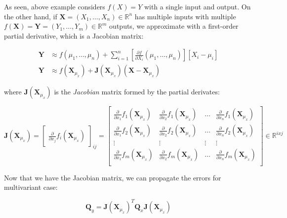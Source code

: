 \documentclass[a4paper]{report}
\numberwithin{figure}{section}
\newcommand{\R}{\mathbb{R}}
\begin{document}
As seen, above example considers $f(X)=Y$ with a single input and output. 
On the other hand, if $\mathbf{X}=(X_1,\dots,X_n) \in \R^n$ has multiple inputs with 
multiple $f(\mathbf{X})=\mathbf{Y}=(Y_1,\dots,Y_m) \in \R^m$ outputs,
we approximate with a first-order partial derivative, which is a Jacobian 
matrix:

\begin{equation}
  \begin{aligned}
    \mathbf{Y} & \approx f(\mu_1,\dots,\mu_n) + 
    \sum_{i=1}^{n} [\frac{\partial f}{\partial X_i}(\mu_1,\dots,\mu_n)][X_i-\mu_i] \\
    \mathbf{Y} & \approx f(\mathbf{X}_{\mu_x}) + \mathbf{J}(\mathbf{X}_{\mu_x}) (\mathbf{X} - \mathbf{X}_{\mu_x})
  \end{aligned}
\end{equation}

where $\mathbf{J}(\mathbf{X}_{\mu_x})$ is the \textit{Jacobian} matrix formed by 
the partial derivates:

\begin{equation}
  \mathbf{J}(\mathbf{X}_{\mu_x}) = \begin{bmatrix} \frac{\partial}{\partial x_j }f_i(\mathbf{X}_{\mu_x}) \end{bmatrix}_{ij} 
  = 
  \begin{bmatrix} 
    \frac{\partial}{\partial x_1}f_1(\mathbf{X}_{\mu_x}) & \frac{\partial}{\partial x_2}f_1(\mathbf{X}_{\mu_x}) & \dots & \frac{\partial}{\partial x_n}f_1(\mathbf{X}_{\mu_x}) \\
    \frac{\partial}{\partial x_1}f_2(\mathbf{X}_{\mu_x}) & \frac{\partial}{\partial x_2}f_2(\mathbf{X}_{\mu_x}) & \dots & \frac{\partial}{\partial x_n}f_2(\mathbf{X}_{\mu_x}) \\
\vdots & \vdots & \vdots & \vdots \\
    \frac{\partial}{\partial x_1}f_m(\mathbf{X}_{\mu_x}) & \frac{\partial}{\partial x_2}f_m(\mathbf{X}_{\mu_x}) & \dots & \frac{\partial}{\partial x_n}f_m(\mathbf{X}_{\mu_x}) \\
  \end{bmatrix}
  \in \R^{ixj}
\end{equation}

Now that we have the Jacobian matrix, we can propagate the errors for multivariant case:

\begin{equation}
  \mathbf{Q}_y = \mathbf{J}(\mathbf{X}_{\mu_x})^T \mathbf{Q}_x \mathbf{J}(\mathbf{X}_{\mu_x})
\end{equation}
\end{document}
